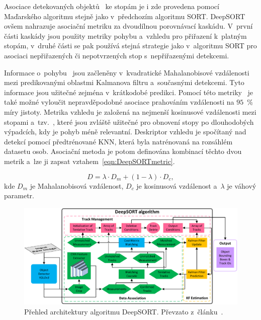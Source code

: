 Asociace detekovaných objektů~\cite{article:Tracking} ke stopám je i zde provedena pomocí Maďarského algoritmu stejně jako v~předchozím algoritmu SORT. DeepSORT ovšem nahrazuje asociační metriku za dvoudílnou porovnávací kaskádu. V~první části kaskády jsou použity metriky pohybu a~vzhledu pro přiřazení k~platným stopám, v~druhé části se pak používá stejná strategie jako v~algoritmu SORT pro asociaci nepřiřazených či nepotvrzených stop s~nepřiřazenými detekcemi.

Informace o~pohybu~\cite{article:Tracking} jsou začleněny v~kvadratické Mahalanobisové vzdálenosti mezi predikovanými oblastmi Kalmanova filtru a~současnými detekcemi. Tyto informace jsou užitečné zejména v~krátkodobé predikci. Pomocí této metriky~\cite{article:DeepSORT} je také možné vyloučit nepravděpodobné asociace prahováním vzdálenosti na $95$~\% míry jistoty. Metrika vzhledu je založená na nejmenší kosinusové vzdálenosti mezi stopami a~tzv.~, které jsou zvláště užitečné pro obnovení stopy po dlouhodobých výpadcích, kdy je pohyb méně relevantní. Deskriptor vzhledu je spočítaný nad detekcí pomocí předtrénované KNN, která byla natrénovaná na rozsáhlém datasetu osob. Asociační metoda je potom definována kombinací těchto dvou metrik a~lze ji zapsat vztahem~\ref{eqn:DeepSORTmetric}.

\begin{equation}
    \label{eqn:DeepSORTmetric}
    D = \lambda \cdot D_{m} + (1 - \lambda) \cdot D_{c},
\end{equation}
kde $D_{m}$ je Mahalanobisová vzdálenost, $D_{c}$ je kosinusová vzdálenost a~$\lambda$ je váhový parametr.

\begin{figure}[hbt]
	\centering
	\setlength{\fboxsep}{0pt}
	\includegraphics[width=1.0\textwidth]{obrazky-figures/DeepSORT.pdf}
	\caption{Přehled architektury algoritmu DeepSORT. Převzato z~článku~\cite{article:Tracking}.}
	\label{img:DeepSORT}
\end{figure}

